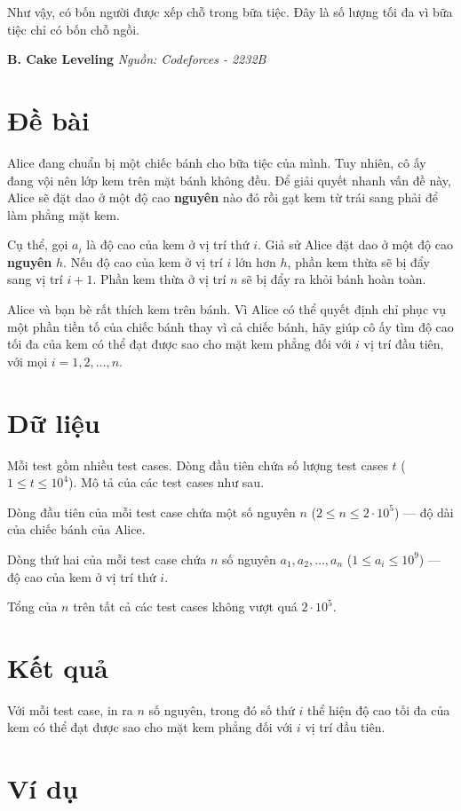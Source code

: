 \documentclass[12pt,a4paper]{article}
\newcommand{\problem}[2]{%
  \addcontentsline{toc}{section}{#1}%
  \begin{mdframed}[
    linecolor=framecolor,
    linewidth=1.5pt,
    backgroundcolor=white,
    topline=true, bottomline=true,
    leftline=true, rightline=true,
    innerleftmargin=10pt, innerrightmargin=10pt,
    innertopmargin=6pt, innerbottommargin=6pt,
  ]
  \textbf{\large #1} \hfill \textit{Nguồn: #2}
  \end{mdframed}
  \vspace{4pt}%
}
\begin{document}
Như vậy, có bốn người được xếp chỗ trong bữa tiệc. Đây là số lượng tối đa vì bữa tiệc chỉ có bốn chỗ ngồi.

\newpage
\problem{B. Cake Leveling}{Codeforces - 2232B}

\section*{Đề bài}
Alice đang chuẩn bị một chiếc bánh cho bữa tiệc của mình. Tuy nhiên, cô ấy đang vội nên lớp kem trên mặt bánh không đều. Để giải quyết nhanh vấn đề này, Alice sẽ đặt dao ở một độ cao \textbf{nguyên} nào đó rồi gạt kem từ trái sang phải để làm phẳng mặt kem.

Cụ thể, gọi $a_i$ là độ cao của kem ở vị trí thứ $i$. Giả sử Alice đặt dao ở một độ cao \textbf{nguyên} $h$. Nếu độ cao của kem ở vị trí $i$ lớn hơn $h$, phần kem thừa sẽ bị đẩy sang vị trí $i+1$. Phần kem thừa ở vị trí $n$ sẽ bị đẩy ra khỏi bánh hoàn toàn.

Alice và bạn bè rất thích kem trên bánh. Vì Alice có thể quyết định chỉ phục vụ một phần tiền tố của chiếc bánh thay vì cả chiếc bánh, hãy giúp cô ấy tìm độ cao tối đa của kem có thể đạt được sao cho mặt kem phẳng đối với $i$ vị trí đầu tiên, với mọi $i = 1, 2, \ldots, n$.

\section*{Dữ liệu}
Mỗi test gồm nhiều test cases. Dòng đầu tiên chứa số lượng test cases $t$ ($1 \le t \le 10^4$). Mô tả của các test cases như sau.

Dòng đầu tiên của mỗi test case chứa một số nguyên $n$ ($2 \le n \le 2\cdot 10^5$) — độ dài của chiếc bánh của Alice.

Dòng thứ hai của mỗi test case chứa $n$ số nguyên $a_1, a_2, \ldots, a_n$ ($1 \le a_i \le 10^9$) — độ cao của kem ở vị trí thứ $i$.

Tổng của $n$ trên tất cả các test cases không vượt quá $2 \cdot 10^5$.

\section*{Kết quả}
Với mỗi test case, in ra $n$ số nguyên, trong đó số thứ $i$ thể hiện độ cao tối đa của kem có thể đạt được sao cho mặt kem phẳng đối với $i$ vị trí đầu tiên.

\section*{Ví dụ}
\end{document}
